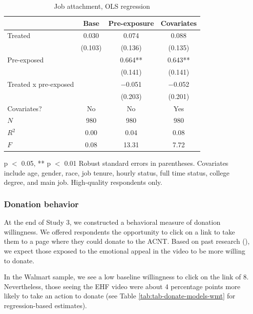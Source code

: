 \documentclass[
  11pt,
  oneside]{article}
\begin{document}
\begin{table}
\centering
\caption{\label{tab:tab-attachment-models-wmt}Job attachment, OLS regression \label{tab:tab-attachment-models-wmt}}
\centering
\begin{threeparttable}
\begin{tabular}[t]{lccc}
\toprule
  & Base & Pre-exposure & Covariates\\
\midrule
Treated & \num{0.030} & \num{0.074} & \num{0.088}\\
 & (\num{0.103}) & (\num{0.136}) & (\num{0.135})\\
Pre-exposed &  & \num{0.664}** & \num{0.643}**\\
 &  & (\num{0.141}) & (\num{0.141})\\
Treated x pre-exposed &  & \num{-0.051} & \num{-0.052}\\
 &  & (\num{0.203}) & (\num{0.201})\\
\midrule
Covariates? & No & No & Yes\\
$N$ & \num{980} & \num{980} & \num{980}\\
$R^2$ & \num{0.00} & \num{0.04} & \num{0.08}\\
$F$ & \num{0.08} & \num{13.31} & \num{7.72}\\
\bottomrule
\end{tabular}
\begin{tablenotes}
\item * p $<$ 0.05, ** p $<$ 0.01 Robust standard errors in parentheses. Covariates include age, gender, race, job tenure, hourly status, full time status, college degree, and main job.  High-quality respondents only.
\end{tablenotes}
\end{threeparttable}
\end{table}

\subsubsection{Donation behavior}\label{donation-behavior}

At the end of Study 3, we constructed a behavioral measure of donation willingness. We offered respondents the opportunity to click on a link to take them to a page where they could donate to the ACNT. Based on past research (), we expect those exposed to the emotional appeal in the video to be more willing to donate.

In the Walmart sample, we see a low baseline willingness to click on the link of 8. Nevertheless, those seeing the EHF video were about 4 percentage points more likely to take an action to donate (see Table \ref{tab:tab-donate-models-wmt} for regression-based estimates).
\end{document}
